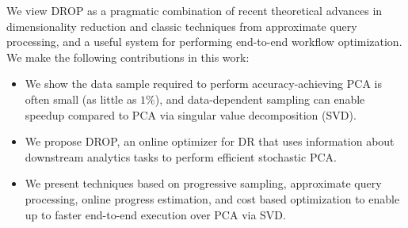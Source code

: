 We view DROP as a pragmatic combination of recent theoretical advances in dimensionality reduction and classic techniques from approximate query processing, and a useful system for performing end-to-end workflow optimization.
We make the following contributions in this work:
\begin{itemize}

\item We show the data sample required to perform accuracy-achieving PCA is often small (as little as $1\%$), and data-dependent sampling can enable \red{$91\times$} speedup compared to PCA via singular value decomposition (SVD). 
  
\item We propose DROP, an online optimizer for DR that uses information about downstream analytics tasks to perform efficient stochastic PCA.

\item We present techniques based on progressive sampling, approximate query processing, online progress estimation, and cost based optimization to enable up to \red{$5\times$} faster end-to-end execution over PCA via SVD.%
\end{itemize}



